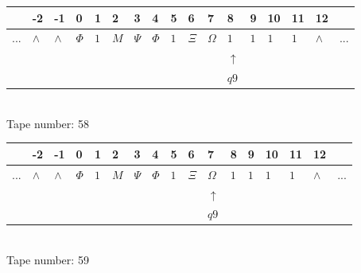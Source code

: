 \documentclass[11pt]{article}
\begin{document}
\begin{table}[H]
\centering
\begin{tabular}{lllllllllllllllll}
 & -2 & -1 & 0 & 1 & 2 & 3 & 4 & 5 & 6 & 7 & 8 & 9 & 10 & 11 & 12 & \\
\hline
$...$ & \multicolumn{1}{|l|}{$\wedge$} & \multicolumn{1}{|l|}{$\wedge$} & \multicolumn{1}{|l|}{$\Phi$} & \multicolumn{1}{|l|}{$1$} & \multicolumn{1}{|l|}{$M$} & \multicolumn{1}{|l|}{$\Psi$} & \multicolumn{1}{|l|}{$\Phi$} & \multicolumn{1}{|l|}{$1$} & \multicolumn{1}{|l|}{$\Xi$} & \multicolumn{1}{|l|}{$\Omega$} & \multicolumn{1}{|l|}{$1$} & \multicolumn{1}{|l|}{$1$} & \multicolumn{1}{|l|}{$1$} & \multicolumn{1}{|l|}{$1$} & \multicolumn{1}{|l|}{$\wedge$} & $...$\\
\hline
&  &  &  &  &  &  &  &  &  &  & $\uparrow$ &  &  &  &  &  \\
&  &  &  &  &  &  &  &  &  &  & $ q9 $ &  &  &  &  &  \\
\end{tabular}
\\
Tape number: 58
\noindent\makebox[\linewidth]{\hdashrule{\textwidth}{1pt}{1pt}}\end{table}

\begin{table}[H]
\centering
\begin{tabular}{lllllllllllllllll}
 & -2 & -1 & 0 & 1 & 2 & 3 & 4 & 5 & 6 & 7 & 8 & 9 & 10 & 11 & 12 & \\
\hline
$...$ & \multicolumn{1}{|l|}{$\wedge$} & \multicolumn{1}{|l|}{$\wedge$} & \multicolumn{1}{|l|}{$\Phi$} & \multicolumn{1}{|l|}{$1$} & \multicolumn{1}{|l|}{$M$} & \multicolumn{1}{|l|}{$\Psi$} & \multicolumn{1}{|l|}{$\Phi$} & \multicolumn{1}{|l|}{$1$} & \multicolumn{1}{|l|}{$\Xi$} & \multicolumn{1}{|l|}{$\Omega$} & \multicolumn{1}{|l|}{$1$} & \multicolumn{1}{|l|}{$1$} & \multicolumn{1}{|l|}{$1$} & \multicolumn{1}{|l|}{$1$} & \multicolumn{1}{|l|}{$\wedge$} & $...$\\
\hline
&  &  &  &  &  &  &  &  &  & $\uparrow$ &  &  &  &  &  &  \\
&  &  &  &  &  &  &  &  &  & $ q9 $ &  &  &  &  &  &  \\
\end{tabular}
\\
Tape number: 59
\noindent\makebox[\linewidth]{\hdashrule{\textwidth}{1pt}{1pt}}\end{table}
\clearpage
\end{document}
